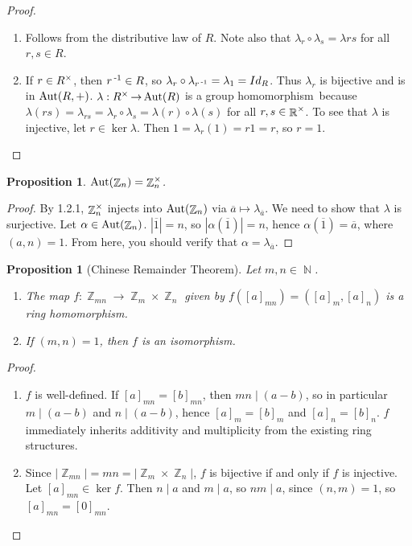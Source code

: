 \documentclass[11pt]{book}
\newcounter{counter}
\newtheorem{proposition}[counter]{Proposition}   \newtheorem{problem}[counter]{Problem}   \newtheorem*{proposition*}{Proposition}   \newtheorem*{lemma*}{Lemma}
\theoremstyle{definition}   \newtheorem{defn}[counter]{Definition} %
\newcommand{\ov}{\overline}   \newcommand{\wt}{\widetilde}
\newcommand{\hm}{homomorphism}   \newcommand{\hms}{homomorphisms}   \newcommand{\iso}{isomorphism}
\DeclareMathOperator{\R}{\mathbb{R}}   \DeclareMathOperator{\N}{\mathbb{N}}   \DeclareMathOperator{\z}{\mathbb{Z}}   \DeclareMathOperator{\Q}{\mathbb{Q}}
\DeclareMathOperator{\ra}{\rightarrow}   \DeclareMathOperator{\Poly}{\mathbf{P}}   \DeclareMathOperator{\spn}{\textnormal{span}}   \DeclareMathOperator{\aut}{\textnormal{Aut}}
\newcommand{\vs}{\vspace{8pt}}
\numberwithin{counter}{chapter}
\begin{document}
\begin{proof}\
\begin{enumerate}
\item[(a)] Follows from the distributive law of $R$. Note also that $\lambda_r \circ \lambda_s = \lambda{rs}$ for all $r,s \in R$.
\item[(b)] If $r \in R^{\times}$, then $r\operatorname{^{-1}} \in R$, so $\lambda_r \circ \lambda_{r\operatorname{^{-1}}} = \lambda_1 = Id_R$. Thus $\lambda_r$ is bijective and is in $\aut(R,+)$. $\lambda : R\x \ra \aut(R)$ is a group \hm\ because $\lambda(rs) = \lambda_{rs} = \lambda_r \circ \lambda_s = \lambda(r) \circ \lambda(s)$ for all $r,s \in \R\x$. To see that $\lambda$ is injective, let $r \in \ker \lambda$. Then $1 = \lambda_r(1) = r 1 = r$, so $r = 1$.
\end{enumerate}
\end{proof}

\vs

\begin{proposition}
$\aut(\z_n) = \z_n\x$.
\end{proposition}

\begin{proof}
By 1.2.1, $\z_n\x$ injects into $\aut(\z_n)$ via $\ov{a} \mapsto \lambda_{\ov{a}}$. We need to show that $\lambda$ is surjective. Let $\alpha \in \aut(\z_n)$. $|\ov{1}| = n$, so $|\alpha(\ov{1})| = n$, hence $\alpha(\ov{1}) = \ov{a}$, where $(a,n) = 1$. From here, you should verify that $\alpha = \lambda_{\ov{a}}$.
\end{proof}

\vs

\begin{proposition}[Chinese Remainder Theorem]
Let $m,n \in \N$.
	\begin{enumerate}
	\item[(a)] The map $f : \z_{mn} \ra \z_m \times \z_n$ given by $f([a]_{mn}) = ([a]_m,[a]_n)$ is a ring \hm.
	\item[(b)] If $(m,n) = 1$, then $f$ is an \iso.
	\end{enumerate}
\end{proposition}

\begin{proof}\
\begin{enumerate}
\item[(a)] $f$ is well-defined. If $[a]_{mn} = [b]_{mn}$, then $mn \mid (a-b)$, so in particular $m \mid (a-b)$ and $n \mid (a-b)$, hence $[a]_m = [b]_m$ and $[a]_n = [b]_n$. $f$ immediately inherits additivity and multiplicity from the existing ring structures.

\item[(b)] Since $|\z_{mn}| = mn = |\z_m \times \z_n|$, $f$ is bijective if and only if $f$ is injective. Let $[a]_{mn} \in \ker f$. Then $n \mid a$ and $m \mid a$, so $nm \mid a$, since $(n,m) = 1$, so $[a]_{mn} = [0]_{mn}$.
\end{enumerate}
\end{proof}
\end{document}
